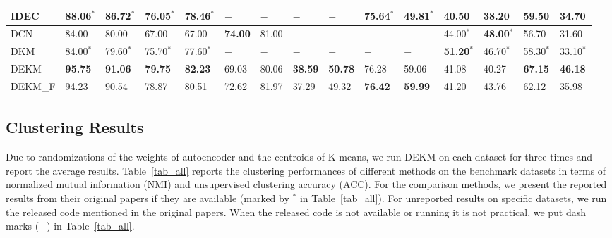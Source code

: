 \begin{table*}[!htb]
\begin{center}
{\begin{tabular}{|l|l|l|l|l|l|l|l|l|l|l|l|l|l|l|}
			IDEC        &88.06$^*$           &86.72$^*$     &76.05$^*$     &78.46$^*$      &$-$             &$-$                &$-$              &$-$           &75.64$^*$         &49.81$^*$      &40.50        &38.20       &59.50      &34.70   \\ \hline
			DCN         &84.00                   &80.00               &67.00             &67.00               &\textbf{74.00} &81.00       &$-$              &$-$           &$-$            &$-$           &44.00$^*$        &\textbf{48.00}$^*$      &56.70       &31.60       \\ \hline
DKM                         &84.00$^*$            &79.60$^*$      &75.70$^*$    &77.60$^*$     &$-$             & $-$             &$-$              &$-$             &$-$              &$-$          &\textbf{51.20}$^*$         &46.70$^*$       &58.30$^*$       &33.10$^*$     \\ \hline
			DEKM                                                             &\textbf{95.75}       & \textbf{91.06} &\textbf{79.75}   &\textbf{82.23}   &69.03   &80.06     &\textbf{38.59}    &\textbf{50.78}     &76.28&59.06&41.08&40.27&\textbf{67.15}&\textbf{46.18}     \\ \hline
			DEKM\_F                                                   &94.23                       &90.54                &78.87          &80.51          &72.62          &81.97          &37.29          &49.32    &\textbf{76.42}&\textbf{59.99}&41.20&43.76&62.12&35.98      \\ \hline
\end{tabular}}
		\label{tab_all}
	\end{center}
\end{table*}

\subsection{Clustering Results}

Due to randomizations of the weights of autoencoder and the centroids of K-means, we run DEKM on each dataset for three times and report the average results. Table~\ref{tab_all} reports the clustering performances of different methods on the benchmark datasets in terms of normalized mutual information (NMI) and unsupervised clustering accuracy (ACC). For the comparison methods, we present the reported results from their original papers if they are available (marked by $^*$ in Table~\ref{tab_all}). For unreported results on specific datasets, we run the released code mentioned in the original papers. When the released code is not available or running it is not practical, we put dash marks ($-$) in Table~\ref{tab_all}. 

